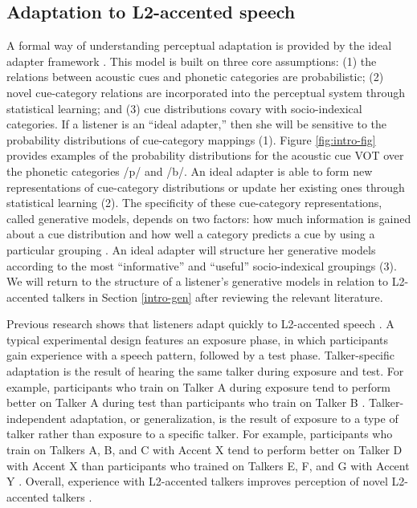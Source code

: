 \documentclass[preprint, 3p, authoryear]{elsarticle} %
\begin{document}
\hypertarget{adaptation-to-l2-accented-speech}{%
\subsection{Adaptation to L2-accented speech}\label{adaptation-to-l2-accented-speech}}

A formal way of understanding perceptual adaptation is provided by the ideal adapter framework \citep{kleinschmidt2015, kleinschmidt2019}.
This model is built on three core assumptions: (1) the relations between acoustic cues and phonetic categories are probabilistic; (2) novel cue-category relations are incorporated into the perceptual system through statistical learning; and (3) cue distributions covary with socio-indexical categories.
If a listener is an ``ideal adapter,'' then she will be sensitive to the probability distributions of cue-category mappings (1).
Figure \ref{fig:intro-fig} provides examples of the probability distributions for the acoustic cue VOT over the phonetic categories /p/ and /b/.
An ideal adapter is able to form new representations of cue-category distributions or update her existing ones through statistical learning (2).
The specificity of these cue-category representations, called generative models, depends on two factors: how much information is gained about a cue distribution and how well a category predicts a cue by using a particular grouping \citep{kleinschmidt2019}.
An ideal adapter will structure her generative models according to the most ``informative'' and ``useful'' socio-indexical groupings (3).
We will return to the structure of a listener's generative models in relation to L2-accented talkers in Section \ref{intro-gen} after reviewing the relevant literature.

Previous research shows that listeners adapt quickly to L2-accented speech \citep{bent2021}.
A typical experimental design features an exposure phase, in which participants gain experience with a speech pattern, followed by a test phase.
Talker-specific adaptation is the result of hearing the same talker during exposure and test.
For example, participants who train on Talker A during exposure tend to perform better on Talker A during test than participants who train on Talker B \citetext{\citealp{bradlow2008}; \citealp{clarke2004}; \citealp{xie2021}; \citealp{xie2017structure}; \citealp{xie2018}; \citealp[cf.][]{bradlow2023}}.
Talker-independent adaptation, or generalization, is the result of exposure to a type of talker rather than exposure to a specific talker.
For example, participants who train on Talkers A, B, and C with Accent X tend to perform better on Talker D with Accent X than participants who trained on Talkers E, F, and G with Accent Y \citep{alexander2019, bradlow2008, sidaras2009, tzeng2016, xie2021, xie2018}.
Overall, experience with L2-accented talkers improves perception of novel L2-accented talkers \citep{witteman2013, tzeng2024, reinisch2014, bieber2022, baese2013}.
\end{document}
